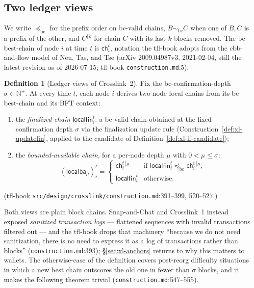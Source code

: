 \documentclass[11pt,a4paper]{article}
\theoremstyle{definition}
\newtheorem{definition}[theorem]{Definition}
\newcommand{\N}{\mathbb{N}}
\begin{document}
\subsection{Two ledger views}\label{sec:xl-views}

We write $\preceq_{\mathrm{bc}}$ for the prefix order on bc-valid chains,
$B \sim_{\mathrm{bc}} C$ when one of $B, C$ is a prefix of the other, and
$C^{\lceil k}$ for chain $C$ with its last $k$ blocks removed. The
bc-best-chain of node $i$ at time $t$ is $\mathsf{ch}_i^t$, notation the
tfl-book adopts from the ebb-and-flow model of Neu, Tas, and Tse (arXiv
2009.04987v3, 2021-02-04, still the latest revision as of 2026-07-15;
tfl-book \texttt{construction.md}:5).

\begin{definition}[Ledger views of Crosslink~2]\label{def:xl-ledger-views}
Fix the bc-confirmation-depth $\sigma \in \N^{+}$. At every time $t$, each
node $i$ derives two node-local chains from its bc-best-chain and its BFT
context:
\begin{enumerate}[label=(\roman*)]
\item the \emph{finalized chain} $\mathsf{localfin}_i^t$: a bc-valid chain
  obtained at the fixed confirmation depth $\sigma$ via the finalization
  update rule (Construction~\ref{def:xl-updatefin}, applied to the
  candidate of Definition~\ref{def:xl-lf-candidate});
\item the \emph{bounded-available chain}, for a per-node depth $\mu$ with
  $0 < \mu \le \sigma$:
  \[
    (\mathsf{localba}_{\mu})_i^t =
    \begin{cases}
      \mathsf{ch}_i^t{}^{\lceil\mu}
        & \text{if } \mathsf{localfin}_i^t \preceq_{\mathrm{bc}}
          \mathsf{ch}_i^t{}^{\lceil\mu},\\[2pt]
      \mathsf{localfin}_i^t & \text{otherwise.}
    \end{cases}
  \]
\end{enumerate}
(tfl-book \texttt{src/design/crosslink/construction.md}:391--399,
520--527.)
\end{definition}

Both views are plain block chains. Snap-and-Chat and Crosslink~1 instead
exposed \emph{sanitized transaction logs} --- flattened sequences with
invalid transactions filtered out --- and the tfl-book drops that machinery
``because we do not need sanitization, there is no need to express it as
a log of transactions rather than blocks''
(\texttt{construction.md}:393);
\S\ref{sec:xl-anchors} returns to why this matters to wallets. The
otherwise-case of the definition covers post-reorg difficulty situations in
which a new best chain outscores the old one in fewer than $\sigma$ blocks,
and it makes the following theorem trivial
(\texttt{construction.md}:547--555).
\end{document}
